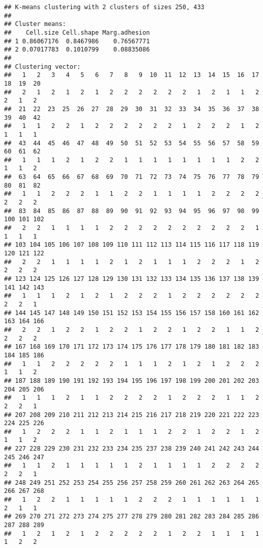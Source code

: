 \documentclass[]{article}
\begin{document}
\begin{verbatim}
## K-means clustering with 2 clusters of sizes 250, 433
## 
## Cluster means:
##    Cell.size Cell.shape Marg.adhesion
## 1 0.86067176  0.8467986    0.76567771
## 2 0.07017783  0.1010799    0.08835086
## 
## Clustering vector:
##   1   2   3   4   5   6   7   8   9  10  11  12  13  14  15  16  17  18  19  20 
##   2   1   2   1   2   1   2   2   2   2   2   2   1   2   1   1   2   2   1   2 
##  21  22  23  25  26  27  28  29  30  31  32  33  34  35  36  37  38  39  40  42 
##   1   1   2   2   1   2   2   2   2   2   2   1   2   2   2   1   2   1   1   1 
##  43  44  45  46  47  48  49  50  51  52  53  54  55  56  57  58  59  60  61  62 
##   1   1   1   2   1   2   2   1   1   1   1   1   1   1   1   2   2   1   1   2 
##  63  64  65  66  67  68  69  70  71  72  73  74  75  76  77  78  79  80  81  82 
##   1   1   2   2   2   1   1   2   2   1   1   1   1   2   2   2   2   2   2   2 
##  83  84  85  86  87  88  89  90  91  92  93  94  95  96  97  98  99 100 101 102 
##   2   2   1   1   1   1   2   2   2   2   2   2   2   2   2   2   1   1   1   1 
## 103 104 105 106 107 108 109 110 111 112 113 114 115 116 117 118 119 120 121 122 
##   2   2   1   1   1   1   2   1   2   1   1   1   2   2   2   1   2   2   2   2 
## 123 124 125 126 127 128 129 130 131 132 133 134 135 136 137 138 139 141 142 143 
##   1   1   1   2   1   2   1   2   2   2   1   2   2   2   2   2   2   2   2   1 
## 144 145 147 148 149 150 151 152 153 154 155 156 157 158 160 161 162 163 164 166 
##   2   2   1   2   2   1   2   2   1   2   2   1   2   2   1   1   2   2   2   2 
## 167 168 169 170 171 172 173 174 175 176 177 178 179 180 181 182 183 184 185 186 
##   1   1   2   2   2   2   2   1   1   1   2   1   2   1   2   2   2   1   1   2 
## 187 188 189 190 191 192 193 194 195 196 197 198 199 200 201 202 203 204 205 206 
##   1   1   1   2   1   1   2   2   2   2   1   2   2   2   1   1   2   2   2   1 
## 207 208 209 210 211 212 213 214 215 216 217 218 219 220 221 222 223 224 225 226 
##   1   2   2   2   1   1   2   1   1   1   2   2   1   2   2   1   2   1   1   2 
## 227 228 229 230 231 232 233 234 235 237 238 239 240 241 242 243 244 245 246 247 
##   1   1   2   1   1   1   1   1   2   1   1   1   1   2   2   2   2   2   2   1 
## 248 249 251 252 253 254 255 256 257 258 259 260 261 262 263 264 265 266 267 268 
##   1   2   2   1   1   1   1   1   2   2   2   1   1   1   1   1   1   2   1   1 
## 269 270 271 272 273 274 275 277 278 279 280 281 282 283 284 285 286 287 288 289 
##   1   2   1   2   1   2   2   2   2   2   1   2   2   1   1   1   1   1   2   2 

\end{verbatim}
\end{document}
